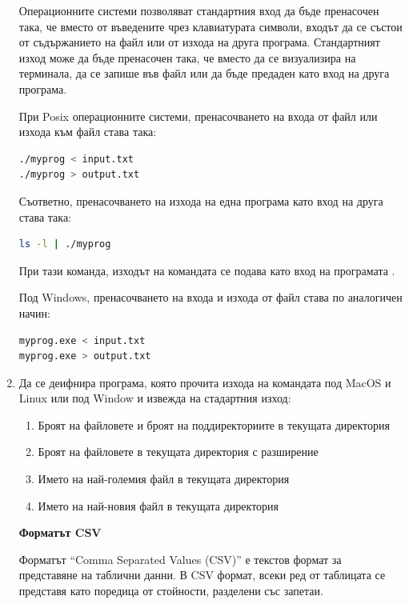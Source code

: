 \begin{enumerate}[]
\begin{mdframed}[hidealllines=true,backgroundcolor=gray!20]
Операционните системи позволяват стандартния вход да бъде пренасочен така, че вместо от въведените чрез клавиатурата символи, входът да се състои от съдържанието на файл или от изхода на друга програма. Стандартният изход може да бъде пренасочен така, че вместо да се визуализира на терминала, да се запише във файл или да бъде предаден като вход на друга програма.

При Posix операционните системи, пренасочването на входа от файл или изхода към файл става така: 
\begin{lstlisting}[basicstyle=\small,language=bash]
./myprog < input.txt
./myprog > output.txt
\end{lstlisting}

Съответно, пренасочването на изхода на една програма като вход на друга става така:
\begin{lstlisting}[basicstyle=\small,language=bash]
ls -l | ./myprog
\end{lstlisting}
При тази команда, изходът на командата  се подава като вход на програмата .

Под Windows, пренасочването на входа и изхода от файл става по аналогичен начин:
\begin{lstlisting}[basicstyle=\small,language=bash]
myprog.exe < input.txt
myprog.exe > output.txt
\end{lstlisting}
\end{mdframed}

\item Да се деифнира програма, която прочита изхода на командата  под MacOS и Linux или  под Window и извежда на стадартния изход:
\begin{enumerate}[label=\alph*)]
	\item Броят на файловете и броят на поддиректориите в текущата директория
	\item Броят на файловете в текущата директория с разширение 
	\item Името на най-големия файл в текущата директория
	\item Името на най-новия файл в текущата директория
\end{enumerate}

\begin{mdframed}[hidealllines=true,backgroundcolor=gray!20]
\textbf{Форматът CSV}


Форматът ``Comma Separated Values (CSV)'' е текстов формат за представяне на таблични данни. В CSV формат, всеки ред от таблицата се представя като поредица от стойности, разделени със запетаи. 


\end{mdframed}
\end{enumerate}
